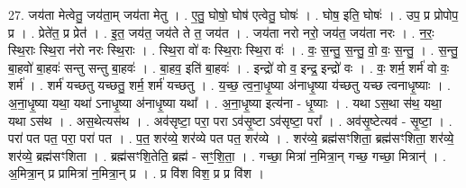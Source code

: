 \documentclass[17pt]{extarticle}
\begin{document}
27. जय॑ता मेत्वेतु॒ जय॑ता॒म् जय॑ता मेतु । . ए॒तु॒ घोषो॒ घोष॑ एत्वेतु॒ घोषः॑ । . घोष॒ इति॒ घोषः॑ । . उप॒ प्र प्रोपोप॒ प्र । . प्रेते॑त॒ प्र प्रेत॑ । . इ॒त॒ जय॑त॒ जय॑ते ते त॒ जय॑त । . जय॑ता नरो नरो॒ जय॑त॒ जय॑ता नरः । . न॒रः॒ स्थि॒राः स्थि॒रा न॑रो नरः स्थि॒राः । . स्थि॒रा वो॑ वः स्थि॒राः स्थि॒रा वः॑ । . वः॒ स॒न्तु॒ स॒न्तु॒ वो॒ वः॒ स॒न्तु॒ । . स॒न्तु॒ बा॒हवो॑ बा॒हवः॑ सन्तु सन्तु बा॒हवः॑ । . बा॒हव॒ इति॑ बा॒हवः॑ । . इन्द्रो॑ वो व॒ इन्द्र॒ इन्द्रो॑ वः । . वः॒ शर्म॒ शर्म॑ वो वः॒ शर्म॑ । . शर्म॑ यच्छतु यच्छतु॒ शर्म॒ शर्म॑ यच्छतु । . य॒च्छ॒ त्व॒ना॒धृ॒ष्या अ॑नाधृ॒ष्या य॑च्छतु यच्छ त्वनाधृ॒ष्याः । . अ॒ना॒धृ॒ष्या यथा॒ यथा॑ ऽनाधृ॒ष्या अ॑नाधृ॒ष्या यथा᳚ । . अ॒ना॒धृ॒ष्या इत्य॑ना - धृ॒ष्याः । . यथा ऽस॒था स॑थ॒ यथा॒ यथा ऽस॑थ । . अस॒थेत्यस॑थ । . अव॑सृष्टा॒ परा॒ परा ऽव॑सृ॒ष्टा ऽव॑सृष्टा॒ परा᳚ । . अव॑सृ॒ष्टेत्यव॑ - सृ॒ष्टा॒ । . परा॑ पत पत॒ परा॒ परा॑ पत । . प॒त॒ शर॑व्ये॒ शर॑व्ये पत पत॒ शर॑व्ये । . शर॑व्ये॒ ब्रह्म॑सꣳशिता॒ ब्रह्म॑सꣳशिता॒ शर॑व्ये॒ शर॑व्ये॒ ब्रह्म॑सꣳशिता । . ब्रह्म॑सꣳशि॒तेति॒ ब्रह्म॑ - सꣳ॒॒शि॒ता॒ । . गच्छा॒ मित्रा॑ न॒मित्रा॒न् गच्छ॒ गच्छा॒ मित्रान्॑ । . अ॒मित्रा॒न् प्र प्रामित्रा॑ न॒मित्रा॒न् प्र । . प्र वि॑श विश॒ प्र प्र वि॑श । \newline
\end{document}
